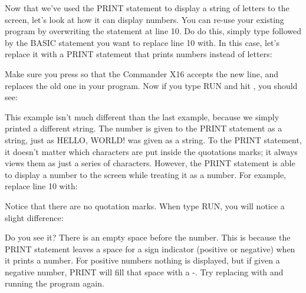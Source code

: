 Now that we've used the {\ttfamily PRINT} statement to display a string of
letters to the screen, let's look at how it can display numbers.  You can
re-use your existing program by overwriting the statement at line 10.  Do do
this, simply type {} followed by the BASIC statement you want to
replace line 10 with.  In this case, let's replace it with a {\ttfamily PRINT}
statement that prints numbers instead of letters:\\


Make sure you press \returnkey so that the Commander X16 accepts the new line,
and replaces the old one in your program.  Now if you type {\ttfamily RUN} and
hit \returnkey, you should see:


This example isn't much different than the last example, because we simply
printed a different string.  The number {} is given to the
{\ttfamily PRINT} statement as a string, just as {\ttfamily HELLO, WORLD!} was
given as a string.  To the {\ttfamily PRINT} statement, it doesn't matter which
characters are put inside the quotations marks; it always views them as just a
series of characters.  However, the {\ttfamily PRINT} statement is able to
display a number to the screen while treating it as a number.  For example,
replace line 10 with:\\


Notice that there are no quotation marks.  When type {\ttfamily RUN}, you will
notice a slight difference:\\


Do you see it?  There is an empty space before the number.  This is because the
{\ttfamily PRINT} statement leaves a space for a sign indicator (positive or
negative) when it prints a number.  For positive numbers nothing is displayed,
but if given a negative number, {\ttfamily PRINT} will fill that space with a
{\ttfamily -}.  Try replacing {} with {} and running
the program again.\\


